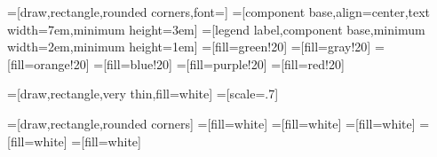 =[draw,rectangle,rounded corners,font=\ttfamily]
=[component base,align=center,text width=7em,minimum height=3em]
=[legend label,component base,minimum width=2em,minimum height=1em]
=[fill=green!20]
=[fill=gray!20]
=[fill=orange!20]
=[fill=blue!20]
=[fill=purple!20]
=[fill=red!20]

=[draw,rectangle,very thin,fill=white]
=[scale=.7]

=[draw,rectangle,rounded corners]
=[fill=white]
=[fill=white]
=[fill=white]
=[fill=white]
=[fill=white]

